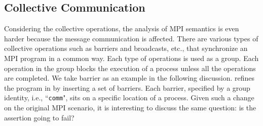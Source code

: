 \subsection{Collective Communication}

\examplefigoneB

Considering the collective operations, the analysis of MPI semantics is even harder because the message communication is affected. There are various types of collective operations such as barriers and broadcasts, etc., that synchronize an MPI program in a common way. Each type of operations is used as a group. Each operation in the group blocks the execution of a process unless all the operations are completed. We take barrier as an example in the following discussion.
 refines the program in  by inserting a set of barriers. Each barrier, specified by a group identity, i.e., ``\texttt{comm}", sits on a specific location of a process. 
Given such a change on the original MPI scenario, it is interesting to discuss the same question: is the assertion going to fail?  

